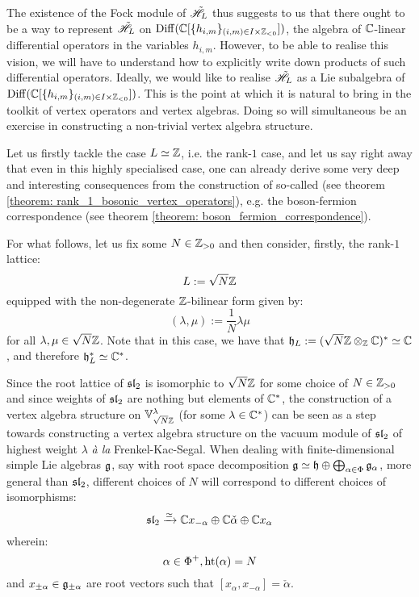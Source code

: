             The existence of the Fock module of $\tilde{\scrH}_L$ thus suggests to us that there ought to be a way to represent $\tilde{\scrH}_L$ on $\Diff(\bbC[ \{h_{i, m}\}_{(i, m) \in I \x \Z_{< 0}} ])$, the algebra of $\bbC$-linear differential operators in the variables $h_{i, m}$. However, to be able to realise this vision, we will have to understand how to explicitly write down products of such differential operators. Ideally, we would like to realise $\tilde{\scrH}_L$ as a Lie subalgebra of $\Diff(\bbC[ \{h_{i, m}\}_{(i, m) \in I \x \Z_{< 0}} ])$. This is the point at which it is natural to bring in the toolkit of vertex operators and vertex algebras. Doing so will simultaneous be an exercise in constructing a non-trivial vertex algebra structure.

            Let us firstly tackle the case $L \cong \Z$, i.e. the rank-$1$ case, and let us say right away that even in this highly specialised case, one can already derive some very deep and interesting consequences from the construction of so-called  (see theorem \ref{theorem: rank_1_bosonic_vertex_operators}), e.g. the boson-fermion correspondence (see theorem \ref{theorem: boson_fermion_correspondence}).
            
            For what follows, let us fix some $N \in \Z_{> 0}$ and then consider, firstly, the rank-$1$ lattice:
                $$L := \sqrt{N} \Z$$
            equipped with the non-degenerate $\Z$-bilinear form given by:
                $$(\lambda, \mu) := \frac1N \lambda \mu$$
            for all $\lambda, \mu \in \sqrt{N} \Z$. Note that in this case, we have that $\h_L := (\sqrt{N}\Z \tensor_{\Z} \bbC)^* \cong \bbC$, and therefore $\h_L^* \cong \bbC^*$.
            \begin{remark}
                Since the root lattice of $\sl_2$ is isomorphic to $\sqrt{N} \Z$ for some choice of $N \in \Z_{> 0}$ and since weights of $\sl_2$ are nothing but elements of $\bbC^*$, the construction of a vertex algebra structure on $\V_{\sqrt{N} \Z}^{\lambda}$ (for some $\lambda \in \bbC^*$) can be seen as a step towards constructing a vertex algebra structure on the vacuum module of $\sl_2$ of highest weight $\lambda$ \textit{\`a la} Frenkel-Kac-Segal. When dealing with finite-dimensional simple Lie algebras $\g$, say with root space decomposition $\g \cong \h \oplus \bigoplus_{\alpha \in \Phi} \g_{\alpha}$, more general than $\sl_2$, different choices of $N$ will correspond to different choices of isomorphisms:
                    $$\sl_2 \xrightarrow[]{\cong} \bbC x_{-\alpha} \oplus \bbC \check{\alpha} \oplus \bbC x_{\alpha}$$
                wherein:
                    $$\alpha \in \Phi^+, \height(\alpha) = N$$
                and $x_{\pm \alpha} \in \g_{\pm \alpha}$ are root vectors such that $[x_{\alpha}, x_{-\alpha}] = \check{\alpha}$.
            \end{remark}

